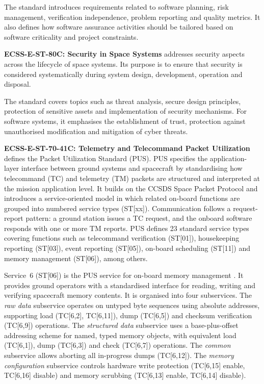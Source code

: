 The standard introduces requirements related to software planning, risk management, verification independence, problem reporting and quality metrics. It also defines how software assurance activities should be tailored based on software criticality and project constraints.


\textbf{ECSS-E-ST-80C: Security in Space Systems} \cite{ECSS-E-ST-80C} addresses security aspects across the lifecycle of space systems. Its purpose is to ensure that security is considered systematically during system design, development, operation and disposal.

The standard covers topics such as threat analysis, secure design principles, protection of sensitive assets and implementation of security mechanisms. For software systems, it emphasises the establishment of trust, protection against unauthorised modification and mitigation of cyber threats.


\textbf{ECSS-E-ST-70-41C: Telemetry and Telecommand Packet Utilization} \cite{ECSS-E-ST-70-41C} defines the Packet Utilization Standard (PUS). PUS specifies the application-layer interface between ground systems and spacecraft by standardising how telecommand (TC) and telemetry (TM) packets are structured and interpreted at the mission application level. It builds on the CCSDS Space Packet Protocol and introduces a service-oriented model in which related on-board functions are grouped into numbered service types (ST[xx]). Communication follows a request-report pattern: a ground station issues a TC request, and the onboard software responds with one or more TM reports. PUS defines 23 standard service types covering functions such as telecommand verification (ST[01]), housekeeping reporting (ST[03]), event reporting (ST[05]), on-board scheduling (ST[11]) and memory management (ST[06]), among others.

Service~6 (ST[06]) is the PUS service for on-board memory management \cite{ECSS-E-ST-70-41C}. It provides ground operators with a standardised interface for reading, writing and verifying spacecraft memory contents. It is organised into four subservices. The \emph{raw data} subservice operates on untyped byte sequences using absolute addresses, supporting load (TC[6,2], TC[6,11]), dump (TC[6,5]) and checksum verification (TC[6,9]) operations. The \emph{structured data} subservice uses a base-plus-offset addressing scheme for named, typed memory objects, with equivalent load (TC[6,1]), dump (TC[6,3]) and check (TC[6,7]) operations. The \emph{common} subservice allows aborting all in-progress dumps (TC[6,12]). The \emph{memory configuration} subservice controls hardware write protection (TC[6,15] enable, TC[6,16] disable) and memory scrubbing (TC[6,13] enable, TC[6,14] disable).

